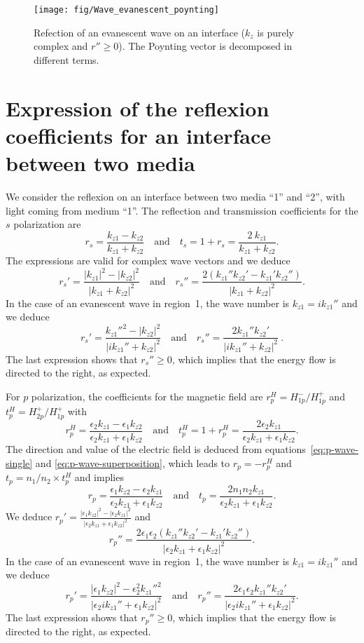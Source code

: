 \begin{figure}[!h]
\texttt{[image: fig/Wave\_evanescent\_poynting]}
\caption{\label{fig:Wave_evanescent_poynting}Refection of an evanescent wave on an interface ($k_z$ is purely complex and $r''\ge 0$). The Poynting vector is decomposed in different terms.}
\end{figure}

\section{Expression of the reflexion coefficients for an interface between two media}

We consider the reflexion on an interface between two media ``1'' and ``2'', with light coming from medium ``1''.
The reflection and transmission coefficients for the $s$ polarization are\cite{Wikipedia_Fresnel}
$$
r_s = \frac{k_{z1}-k_{z2}}{k_{z1}+k_{z2}} 
\quad\textrm{and}\quad
t_s = 1 + r_s = \frac{2\ k_{z1}}{k_{z1}+k_{z2}}.
$$
The expressions are valid for complex wave vectors and we deduce
$$
r_s' = \frac{|k_{z1}|^2 - |k_{z2}|^2}{|k_{z1} + k_{z2}|^2}
\quad\textrm{and}\quad
r_s'' = \frac{2 (k_{z1}'' k_{z2}' - k_{z1}' k_{z2}'')}{|k_{z1} + k_{z2}|^2}.
$$
In the case of an evanescent wave in region~1, the wave number is $k_{z1} = i k_{z1}''$ and we deduce
$$
r_s' = \frac{k_{z1}''^2 - |k_{z2}|^2}{|ik_{z1}'' + k_{z2}|^2}
\quad\textrm{and}\quad
r_s'' = \frac{2 k_{z1}'' k_{z2}'}{|ik_{z1}'' + k_{z2}|^2}
\ .
$$
The last expression shows that $r_s'' \ge 0$, which implies that the energy flow is directed to the right, as expected.

For $p$ polarization, the coefficients for the magnetic field are
$r^H_p = H^-_{1p} / H^+_{1p}$ and $t^H_p = H^+_{2p} / H^+_{1p}$ with
$$
r^H_p=\frac{\epsilon_2k_{z1}-\epsilon_1k_{z2}}{\epsilon_2k_{z1}+\epsilon_1k_{z2}}
\quad\textrm{and}\quad
t^H_p = 1+r^H_p = \frac{2\epsilon_2 k_{z1}}{\epsilon_2k_{z1}+\epsilon_1k_{z2}}
.
$$
The direction and value of the electric field is deduced from equations~\ref{eq:p-wave-single} and \ref{eq:p-wave-superposition}, which leads to $r_p=-r^H_p$ and $t_p = n_1/n_2 \times t^H_p$ and implies \cite{Wikipedia_Fresnel}
$$
r_p=
\frac{\epsilon_1k_{z2} - \epsilon_2k_{z1}}{\epsilon_2k_{z1}+\epsilon_1k_{z2}}
\quad\textrm{and}\quad 
t_p = 
\frac{2 n_1 n_2 k_{z1}}{\epsilon_2k_{z1}+\epsilon_1k_{z2}}.
$$
We deduce
$ \displaystyle
r_p' = \frac{|\epsilon_1 k_{z2}|^2 - |\epsilon_2 k_{z1}|^2}{|\epsilon_2 k_{z1} + \epsilon_1 k_{z2}|^2}$ 
and
$$
r_p'' = \frac{2 \epsilon_1\epsilon_2(k_{z1}'' k_{z2}' - k_{z1}' k_{z2}'')}{|\epsilon_2 k_{z1} + \epsilon_1 k_{z2}|^2}.
$$
In the case of an evanescent wave in region~1, the wave number is $k_{z1} = i k_{z1}''$ and we deduce
$$
r_p' = \frac{|\epsilon_1 k_{z2}|^2 - \epsilon_2^2 k_{z1}''^2}{|\epsilon_2 i k_{z1}'' + \epsilon_1 k_{z2}|^2}
\quad\textrm{and}\quad
r_p'' =  \frac{2 \epsilon_1\epsilon_2 k_{z1}'' k_{z2}'}{|\epsilon_2 i k_{z1}'' + \epsilon_1 k_{z2}|^2}
.
$$
The last expression shows that $r_p''\ge 0$, which implies that the energy flow is directed to the right, as expected.

